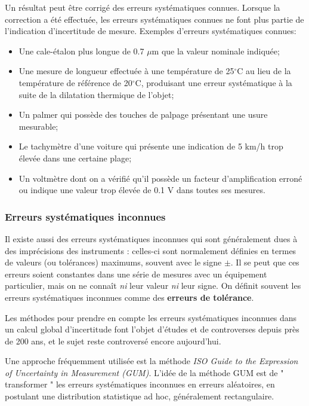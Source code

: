 Un résultat peut être corrigé des erreurs systématiques connues. Lorsque la correction a été effectuée, les erreurs systématiques connues ne font plus partie de l'indication d'incertitude de mesure. Exemples d'erreurs systématiques connues:
\begin{itemize}

\item Une cale-étalon plus longue de 0.7 $\mu$m que la valeur nominale indiquée;
\item Une mesure de longueur effectuée à une température de 25$^{\circ}$C au lieu de la température de référence de 20$^{\circ}$C, produisant une erreur systématique à la suite de la dilatation thermique de l'objet;
\item Un palmer qui possède des touches de palpage présentant une usure mesurable;
\item Le tachymètre d'une voiture qui présente une indication de 5 km/h trop élevée dans une certaine plage;
\item Un voltmètre dont on a vérifié qu'il possède un facteur d'amplification erroné ou indique une valeur trop élevée de 0.1 V dans toutes ses mesures.
\end{itemize}

\subsubsection{Erreurs systématiques inconnues}

Il existe aussi des erreurs systématiques inconnues qui sont généralement dues à des imprécisions des instruments : celles-ci sont normalement définies en termes de valeurs (ou tolérances) maximums, souvent avec le signe $\pm$. Il se peut que ces erreurs soient constantes dans une série de mesures avec un équipement particulier, mais on ne connaît \textit{ni} leur valeur \textit{ni} leur signe. On définit souvent les erreurs systématiques inconnues comme des \textbf{erreurs de tolérance}.

Les méthodes pour prendre en compte les erreurs systématiques inconnues dans un calcul global d'incertitude font l'objet d'études et de controverses depuis près de 200 ans, et le sujet reste controversé encore aujourd'hui.

Une approche fréquemment utilisée est la méthode \textit{ISO Guide to the Expression of Uncertainty in Measurement (GUM)}. L'idée de la méthode GUM est de " transformer " les erreurs systématiques inconnues en erreurs aléatoires, en postulant une distribution statistique ad hoc, généralement rectangulaire.

